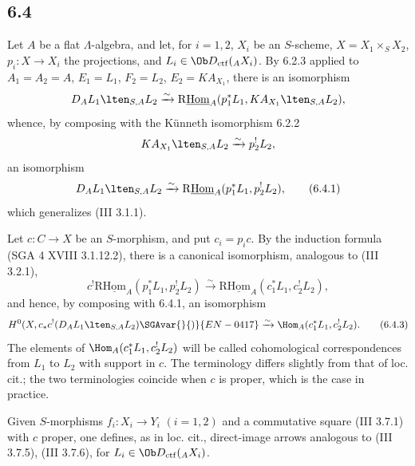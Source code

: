 \subsection*{6.4}
Let $A$ be a flat $\Lambda$-algebra, and let, for $i=1,2$, $X_i$ be an $S$-scheme, $X=X_1\times_SX_2$, $p_i:X\to X_i$ the projections, and $L_i\in\Ob D_{\mathrm{ctf}}({}_AX_i)$. By 6.2.3 applied to $A_1=A_2=A$, $E_1=L_1$, $F_2=L_2$, $E_2=KA_{X_1}$, there is an isomorphism
\[
D_A L_1\lten_{S,A}L_2
\xrightarrow{\sim}
\mathrm{R}\underline{\mathrm{Hom}}_A(p_1^*L_1,KA_{X_1}\lten_{S,A}L_2),
\]
whence, by composing with the Künneth isomorphism 6.2.2
\[
KA_{X_1}\lten_{S,A}L_2\xrightarrow{\sim}p_2^!L_2,
\]
an isomorphism
\begin{equation}
D_AL_1\lten_{S,A}L_2
\xrightarrow{\sim}
\mathrm{R}\underline{\mathrm{Hom}}_A(p_1^*L_1,p_2^!L_2),
\tag{6.4.1}
\end{equation}
which generalizes (III 3.1.1).

Let $c:C\to X$ be an $S$-morphism, and put $c_i=p_ic$. By the induction formula (SGA 4 XVIII 3.1.12.2), there is a canonical isomorphism, analogous to (III 3.2.1),
\begin{equation}
c^!\mathrm{R}\underline{\mathrm{Hom}}_A(p_1^*L_1,p_2^!L_2)
\xrightarrow{\sim}
\mathrm{R}\underline{\mathrm{Hom}}_A(c_1^*L_1,c_2^!L_2),
\tag{6.4.2}
\end{equation}
and hence, by composing with 6.4.1, an isomorphism
\begin{equation}
H^0(X,c_*c^!(D_AL_1\lten_{S,A}L_2)\SGAvar{}{)}{EN-0417}
\xrightarrow{\sim}
\Hom_A(c_1^*L_1,c_2^!L_2).
\tag{6.4.3}
\end{equation}
The elements of $\Hom_A(c_1^*L_1,c_2^!L_2)$ will be called cohomological correspondences from $L_1$ to $L_2$ with support in $c$. The terminology differs slightly from that of loc. cit.; the two terminologies coincide when $c$ is proper, which is the case in practice.

Given $S$-morphisms $f_i:X_i\to Y_i$ $(i=1,2)$ and a commutative square (III 3.7.1) with $c$ proper, one defines, as in loc. cit., direct-image arrows analogous to (III 3.7.5), (III 3.7.6), for $L_i\in\Ob D_{\mathrm{ctf}}({}_AX_i)$.


